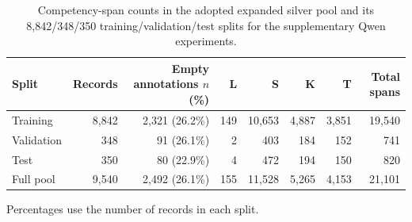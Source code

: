 \documentclass[fleqn,12pt]{wlpeerj}
\begin{document}
\setcounter{table}{11}
\begin{table}[htbp]
\caption{Competency-span counts in the adopted expanded silver pool and its 8,842/348/350 training/validation/test splits for the supplementary Qwen experiments.}
\label{tab:expanded-silver-composition}
\centering\small
\setlength{\tabcolsep}{4pt}
\begin{tabular}{@{}lrrrrrrr@{}}
\toprule
Split & Records & \makecell{Empty annotations\\$n$ (\%)} & L & S & K & T & Total spans \\
\midrule
Training & 8,842 & 2,321 (26.2\%) & 149 & 10,653 & 4,887 & 3,851 & 19,540 \\
Validation & 348 & 91 (26.1\%) & 2 & 403 & 184 & 152 & 741 \\
Test & 350 & 80 (22.9\%) & 4 & 472 & 194 & 150 & 820 \\
\midrule
Full pool & 9,540 & 2,492 (26.1\%) & 155 & 11,528 & 5,265 & 4,153 & 21,101 \\
\bottomrule
\end{tabular}
\par\smallskip
{\footnotesize\RaggedRight Percentages use the number of records in each split.\par}
\end{table}

\end{document}

